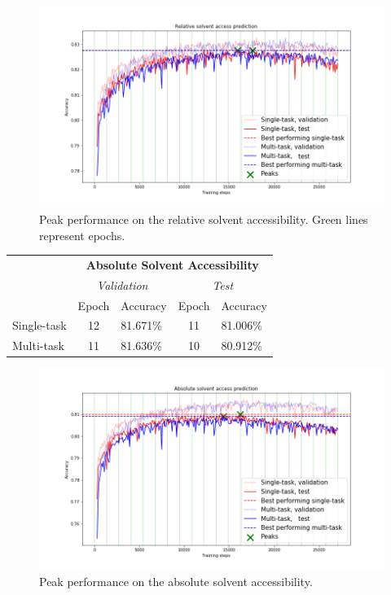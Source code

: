 \begin{figure}[H]
  \centering
  \includegraphics[width=\linewidth]{../graphs/final/rel_final_small}
  \caption{Peak performance on the relative solvent accessibility. Green lines represent epochs.}
\end{figure}

\begin{table}[h]
\centering
\begin{tabular}{lclcl}
 & \multicolumn{4}{c}{\textbf{Absolute Solvent Accessibility}} \\
 & \multicolumn{2}{c|}{\textit{Validation}} & \multicolumn{2}{c}{\textit{Test}} \\ \cline{2-5} 
 & \multicolumn{1}{l}{Epoch} & \multicolumn{1}{l|}{Accuracy} & \multicolumn{1}{l}{Epoch} & Accuracy \\
Single-task & 12 & \multicolumn{1}{l|}{81.671\%} & 11 & 81.006\% \\
Multi-task & 11 & \multicolumn{1}{l|}{81.636\%} & 10 & 80.912\%
\end{tabular}
\end{table}

\begin{figure}[H]
  \centering
  \includegraphics[width=\linewidth]{../graphs/final/abs_final_small}
  \caption{Peak performance on the absolute solvent accessibility.}
\end{figure}

